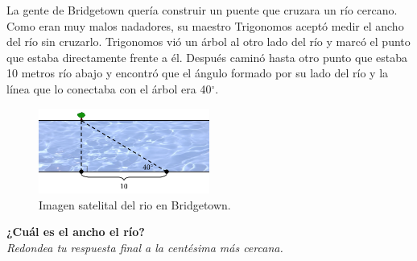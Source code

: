 La gente de Bridgetown quería construir un puente que cruzara un río cercano.
Como eran muy malos nadadores, su maestro Trigonomos aceptó medir el ancho del río sin cruzarlo.
Trigonomos vió un árbol al otro lado del río y marcó el punto que estaba directamente frente a él.
Después caminó hasta otro punto que estaba 10 metros río abajo y encontró que el ángulo formado
por su lado del río y la línea que lo conectaba con el árbol era 40$^\circ$.\\
\begin{figure}[H]
    \begin{center}
        \includegraphics[width=0.5\textwidth]{../images/river1.png}
    \end{center}
    \caption{Imagen satelital del rio en Bridgetown.}
    \label{fig:river1}
\end{figure}
\textbf{¿Cuál es el ancho el río?}\\
\textit{Redondea tu respuesta final a la centésima más cercana.}